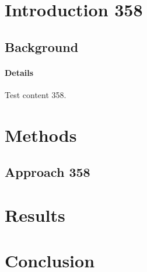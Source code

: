 \documentclass{article}
\begin{document}
\section{Introduction 358}
\subsection{Background}
\paragraph{Details} Test content 358.
\section{Methods}
\subsection{Approach 358}
\section{Results}
\section{Conclusion}
\end{document}

